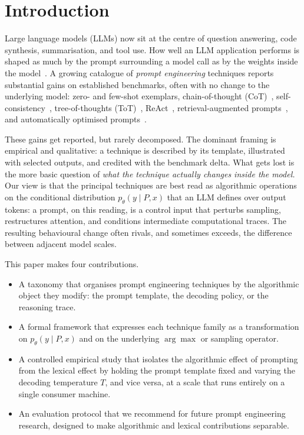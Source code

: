 \documentclass[conference]{IEEEtran}
\begin{document}

\section{Introduction}
\label{sec:intro}

Large language models (LLMs) now sit at the centre of question
answering, code synthesis, summarisation, and tool use.  How well an
LLM application performs is shaped as much by the prompt surrounding
a model call as by the weights inside the model~\cite{b1,b2}.  A
growing catalogue of \emph{prompt engineering} techniques reports
substantial gains on established benchmarks, often with no change to
the underlying model: zero- and few-shot exemplars, chain-of-thought
(CoT)~\cite{b3}, self-consistency~\cite{b4}, tree-of-thoughts
(ToT)~\cite{b5}, ReAct~\cite{b6}, retrieval-augmented
prompts~\cite{b7}, and automatically optimised prompts~\cite{b17}.

These gains get reported, but rarely decomposed.  The dominant
framing is empirical and qualitative: a technique is described by its
template, illustrated with selected outputs, and credited with the
benchmark delta.  What gets lost is the more basic question of
\emph{what the technique actually changes inside the model.}  Our
view is that the principal techniques are best read as algorithmic
operations on the conditional distribution $p_\theta(y \mid P, x)$
that an LLM defines over output tokens: a prompt, on this reading, is
a control input that perturbs sampling, restructures attention, and
conditions intermediate computational traces.  The resulting
behavioural change often rivals, and sometimes exceeds, the
difference between adjacent model scales.

This paper makes four contributions.
\begin{itemize}
  \item A taxonomy that organises prompt engineering techniques by the
        algorithmic object they modify: the prompt template, the
        decoding policy, or the reasoning trace.
  \item A formal framework that expresses each technique family as a
        transformation on $p_\theta(y \mid P, x)$ and on the
        underlying $\arg\max$ or sampling operator.
  \item A controlled empirical study that isolates the algorithmic
        effect of prompting from the lexical effect by holding the
        prompt template fixed and varying the decoding temperature
        $T$, and vice versa, at a scale that runs entirely on
        a single consumer machine.
  \item An evaluation protocol that we recommend for future prompt
        engineering research, designed to make algorithmic and
        lexical contributions separable.
\end{itemize}
\end{document}
